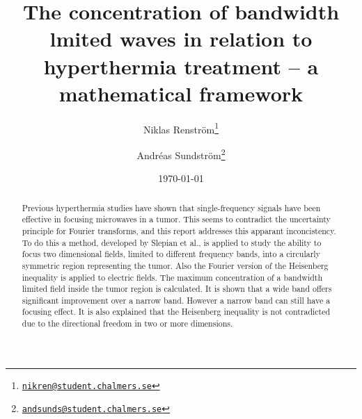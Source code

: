\documentclass[11pt,a4paper, 
swedish,english %
]{article}
\begin{document}


%


\begin{titlepage}
\title{The concentration of bandwidth lmited waves
in relation to hyperthermia treatment
-- a mathematical framework}
\author{Niklas Renström\footnote{\href{mailto:nikren@student.chalmers.se}{\tt nikren@student.chalmers.se}} 
\and Andréas Sundström\footnote{\href{mailto:andsunds@student.chalmers.se}{\tt andsunds@student.chalmers.se}}
}

\date{\today}

\maketitle


\thispagestyle{empty} \pagestyle{empty} %

\begin{abstract}
Previous hyperthermia studies have shown that single-frequency signals
have been effective in focusing microwaves in a tumor. This seems to 
contradict the uncertainty principle for Fourier transforms, and this
report addresses this apparant inconcistency. To do this a method,
developed by Slepian et al., is applied to study the ability to focus
two dimensional fields, limited to different frequency bands, into a
circularly symmetric region representing the tumor. Also the Fourier 
version of the Heisenberg inequality is applied to electric fields. 
The maximum concentration of a bandwidth limited field inside the tumor 
region is calculated. It is shown that a wide band offers 
significant improvement over a narrow band. However a narrow band can 
still have a focusing effect.
It is also explained that the Heisenberg inequality is not contradicted due
to the directional freedom in two or more dimensions. 
\end{abstract}
\newpage
\tableofcontents
\end{titlepage}

\setcounter{page}{1}
\end{document}
